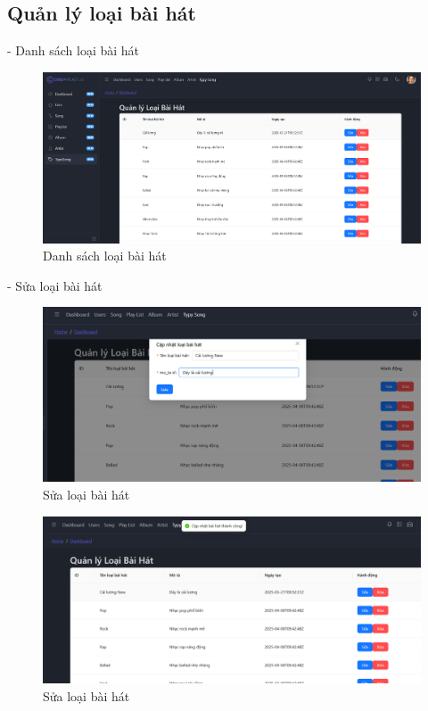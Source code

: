 \subsection{Quản lý loại bài hát}
- Danh sách loại bài hát
\begin{figure}[H]
    \centering
    \includegraphics[width=1\textwidth]{imgs/chap5/ql_loai_bai_hat_1.png}
    \caption{Danh sách loại bài hát}
\end{figure}

- Sửa loại bài hát
\begin{figure}[H]
    \centering
    \includegraphics[width=1\textwidth]{imgs/chap5/ql_loai_bai_hat_2.png}
    \caption{Sửa loại bài hát}
\end{figure}
\begin{figure}[H]
    \centering
    \includegraphics[width=1\textwidth]{imgs/chap5/ql_loai_bai_hat_3.png}
    \caption{Sửa loại bài hát}
\end{figure}

